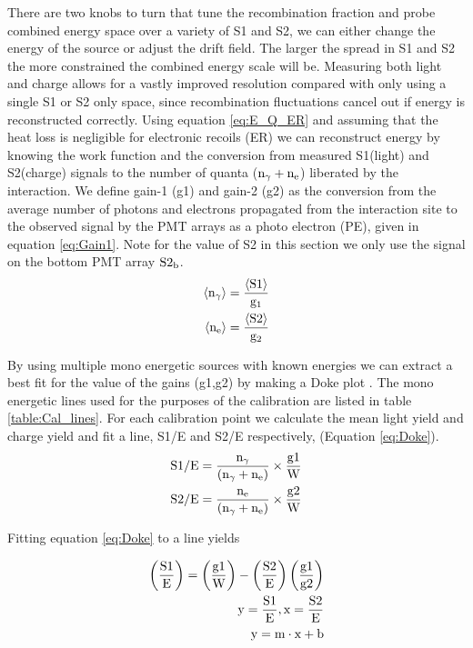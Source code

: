 There are two knobs to turn that tune the recombination fraction and probe combined energy space over a variety of S1 and S2, we can either change the energy of the source or adjust the drift field. The larger the spread in S1 and S2 the more constrained the combined energy scale will be. Measuring both light and charge allows for a vastly improved resolution compared with only using a single S1 or S2 only space, since recombination fluctuations cancel out if energy is reconstructed correctly. Using equation \ref{eq:E_Q_ER} and assuming that the heat loss is negligible for electronic recoils (ER) we can reconstruct energy by knowing the work function and the conversion from measured S1(light) and S2(charge) signals to the number of quanta ($\rm n_\gamma + n_e$) liberated by the interaction. We define gain-1 (g1) and gain-2 (g2) as the conversion from the average number of photons and electrons propagated from the interaction site to the observed signal by the PMT arrays as a photo electron (PE), given in equation \ref{eq:Gain1}. Note for the value of S2 in this section we only use the signal on the bottom PMT array $\rm S2_b$.
\begin{equation}
\begin{split}
\rm  \left<n_\gamma\right> = \frac{\left<S1\right>}{g_1}\\
\rm \left<n_{e}\right> = \frac{\left<S2\right>}{g_2}
\label{eq:Gain1}
\end{split}
\end{equation}

\noindent By using multiple mono energetic sources with known energies we can extract a best fit for the value of the gains (g1,g2) by making a Doke plot \cite{Doke_alpha} \cite{alpha_xenon}. The mono energetic lines used for the purposes of the calibration are listed in table \ref{table:Cal_lines}. For each calibration point we calculate the mean light yield and charge yield and fit a line, S1/E and S2/E respectively, (Equation \ref{eq:Doke}).
\begin{equation}
\begin{split}
\rm  S1/E= \frac{n_\gamma}{(n_\gamma+n_e)}\times\frac{g1}{W} \\
\rm  S2/E= \frac{n_e}{(n_\gamma+n_e)}\times\frac{g2}{W}
\label{eq:Doke}
\end{split}
\end{equation}

\noindent Fitting equation \ref{eq:Doke} to a line yields

\begin{equation}
\begin{split}
\rm  \left(\frac{S1}{E}\right)=\left(\frac{g1}{W}\right) - \left(\frac{S2}{E}\right)\left(\frac{g1}{g2}\right) \\
\rm y=\frac{S1}{E}, x=\frac{S2}{E} \\
\rm y= m\cdot x + b
\label{eq:LinFit}
\end{split}
\end{equation}

